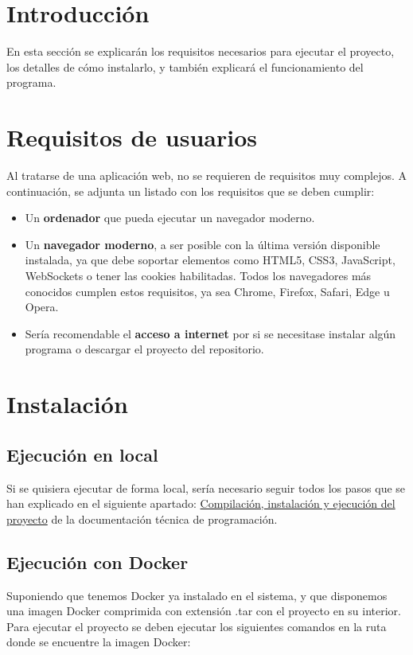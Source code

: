 
\section{Introducción}
En esta sección se explicarán los requisitos necesarios para ejecutar el proyecto, los detalles de cómo instalarlo, y también explicará el funcionamiento del programa.

\section{Requisitos de usuarios}
Al tratarse de una aplicación web, no se requieren de requisitos muy complejos. A continuación, se adjunta un listado con los requisitos que se deben cumplir:
\begin{itemize}
    \tightlist
    \item Un \textbf{ordenador} que pueda ejecutar un navegador moderno.
    \item Un \textbf{navegador moderno}, a ser posible con la última versión disponible instalada, ya que debe soportar elementos como HTML5, CSS3, JavaScript, WebSockets o tener las cookies habilitadas. Todos los navegadores más conocidos cumplen estos requisitos, ya sea Chrome, Firefox, Safari, Edge u Opera.
    \item Sería recomendable el \textbf{acceso a internet} por si se necesitase instalar algún programa o descargar el proyecto del repositorio.
\end{itemize}

\section{Instalación}

\subsection{Ejecución en local}
Si se quisiera ejecutar de forma local, sería necesario seguir todos los pasos que se han explicado en el siguiente apartado: \hyperref[sec:compilacion]{Compilación, instalación y ejecución del proyecto} de la documentación técnica de programación.

\subsection{Ejecución con Docker}
Suponiendo que tenemos Docker ya instalado en el sistema, y que disponemos una imagen Docker comprimida con extensión .tar con el proyecto en su interior. Para ejecutar el proyecto se deben ejecutar los siguientes comandos en la ruta donde se encuentre la imagen Docker:

